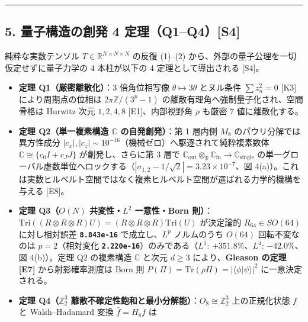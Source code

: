 \documentclass[
  a4paper,
]{ltjsarticle}
\providecommand{\tightlist}{%
  \setlength{\itemsep}{0pt}\setlength{\parskip}{0pt}}
\begin{document}
\begin{center}\rule{0.5\linewidth}{0.5pt}\end{center}

\subsection{5. 量子構造の創発 4
定理（Q1--Q4）{[}S4{]}}\label{ux91cfux5b50ux69cbux9020ux306eux5275ux767a-4-ux5b9aux7406q1q4s4}

純粋な実数テンソル \(T \in \mathbb{R}^{N\times N\times N}\) の反復
(1)--(2) から、外部の量子公理を一切仮定せずに量子力学の 4 本柱が以下の 4
定理として導出される {[}S4{]}。

\begin{itemize}
\tightlist
\item
  \textbf{定理 Q1（厳密離散化）}：3 倍角位相写像
  \(\theta \mapsto 3\theta\) とヌル条件 \(\sum z_n^2 = 0\) {[}K3{]}
  により周期点の位相は \(2\pi\mathbb{Z}/(3^p - 1)\)
  の離散有理角へ強制量子化され、空間骨格は Hurwitz 次元 \(1,2,4,8\)
  {[}E1{]}、内部視野角 \(\rho\) も厳密 7 値に離散化する。
\item
  \textbf{定理 Q2（単一複素構造 \(\mathbb{C}\) の自発創発）}：第 1
  層内側 \(M_8\) のパウリ分解では異方性成分
  \(|c_x|, |c_z| \sim 10^{-16}\)（機械ゼロ）へ駆逐されて純粋複素数体
  \(\mathbb{C} \cong \{c_0 I + c_J J\}\) が創発し、さらに第 3 層で
  \(\mathbb{C}_{\mathrm{out}}\otimes_{\mathbb{R}}\mathbb{C}_{\mathrm{in}} \to \mathbb{C}_{\mathrm{single}}\)
  の単一グローバル虚数単位へロックする（\(|\sigma_{1,2} - 1/\sqrt{2}| = 3.23 \times 10^{-7}\)、図
  4(a)）。これは実数ヒルベルト空間ではなく複素ヒルベルト空間が選ばれる力学的機構を与える
  {[}E8{]}。
\item
  \textbf{定理 Q3（\(O(N)\) 共変性・\(L^2\) 一意性・Born
  則）}：\(\mathrm{Tri}((R\otimes R\otimes R)U) = (R\otimes R\otimes R)\mathrm{Tri}(U)\)
  が決定論的 \(R_{64} \in SO(64)\) に対し相対誤差
  \textbf{\texttt{8.843e-16}} で成立し、\(L^p\) ノルムのうち \(O(64)\)
  回転不変なのは \(p = 2\)（相対変化
  \textbf{\texttt{2.220e-16}}）のみである（\(L^1\):
  \(+351.8\%\)、\(L^4\): \(-42.0\%\)、図 4(b)）。定理 Q2 の複素構造
  \(\mathbb{C}\) と次元 \(d \ge 3\) により、\textbf{Gleason の定理
  {[}E7{]}} から射影確率測度は Born 則
  \(P(\Pi) = \mathrm{Tr}(\rho\Pi) = |\langle\phi|\psi\rangle|^2\)
  に一意決定される。
\item
  \textbf{定理 Q4（\(\mathbb{Z}_2^3\)
  離散不確定性飽和と最小分解能）}：\(O_8 \cong \mathbb{Z}_2^3\)
  上の正規化状態 \(f\) と Walsh--Hadamard 変換 \(\hat{f} = H_8 f\) は

\end{itemize}
\end{document}
